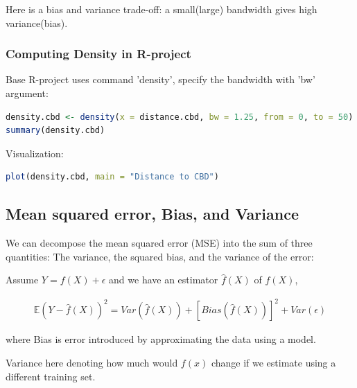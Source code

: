 Here is a bias and variance trade-off: a small(large) bandwidth gives high variance(bias).

\subsubsection{Computing Density in R-project}

Base R-project uses command 'density', specify the bandwidth with 'bw' argument:

\begin{lstlisting}[language = R]
density.cbd <- density(x = distance.cbd, bw = 1.25, from = 0, to = 50)
summary(density.cbd)
\end{lstlisting}

\noindent Visualization:

\begin{lstlisting}[language = R]
plot(density.cbd, main = "Distance to CBD")
\end{lstlisting}

\subsection{Mean squared error, Bias, and Variance}

\indent

We can decompose the mean squared error (MSE) into the sum of three quantities: The variance, the squared bias, and the variance of the error:

Assume $Y = f(X)+\epsilon$ and we have an estimator $\hat{f}(X)$ of $f(X)$,

\begin{align*}
    \mathbb{E}(Y-\hat{f}(X))^2 = Var(\hat{f}(X))+[Bias(\hat{f}(X))]^2 + Var(\epsilon)
\end{align*}

where Bias is error introduced by approximating the data using a model.

Variance here denoting how much would $f(x)$ change if we estimate using a different training set.


